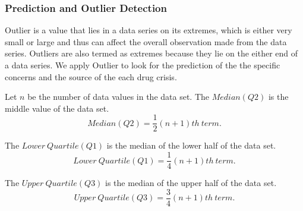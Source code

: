 \documentclass{mcmthesis}
\begin{document}



\subsubsection{Prediction and Outlier Detection}

Outlier is a value that lies in a data series on its extremes, which is either very small or large and thus can affect the overall observation made from the data series. Outliers are also termed as extremes because they lie on the either end of a data series. We apply Outlier to look for the prediction of the the specific concerns and the source of the each drug crisis.  

Let $n$ be the number of data values in the data set. The $Median \left(Q2\right)$ is the middle value of the data set.
\begin{equation}
Median \left (Q2\right )=\frac{1}{2}\left ( n+1 \right )th~term.
\end{equation}

The $Lower~Quartile \left (Q1\right )$ is the median of the lower half of the data set.
\begin{equation}
    Lower~Quartile \left (Q1\right )=\frac{1}{4}\left ( n+1 \right )th~term.
\end{equation}

The $Upper~Quartile \left (Q3\right )$ is the median of the upper half of the data set.
\begin{equation}
    Upper~Quartile \left (Q3\right )=\frac{3}{4}\left ( n+1 \right )th~term.
\end{equation}
\end{document}
